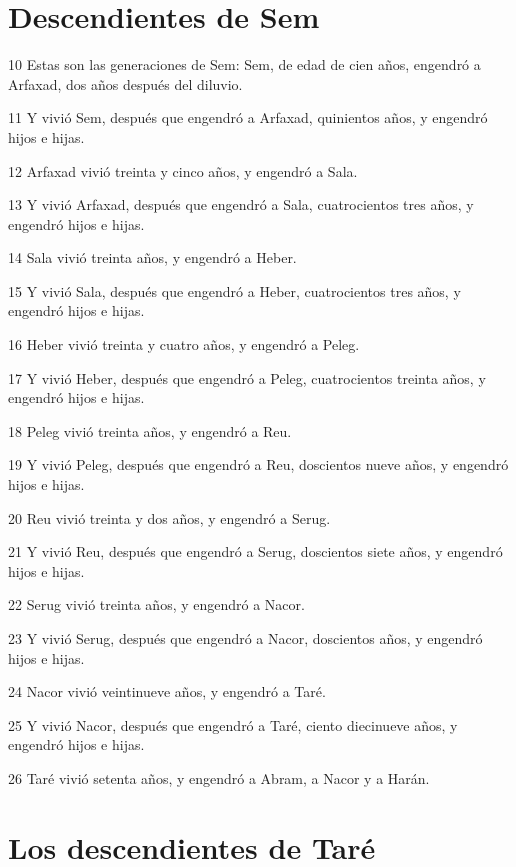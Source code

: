 \section*{Descendientes de Sem}

\par 10 Estas son las generaciones de Sem: Sem, de edad de cien años, engendró a Arfaxad, dos años después del diluvio.
\par 11 Y vivió Sem, después que engendró a Arfaxad, quinientos años, y engendró hijos e hijas.
\par 12 Arfaxad vivió treinta y cinco años, y engendró a Sala.
\par 13 Y vivió Arfaxad, después que engendró a Sala, cuatrocientos tres años, y engendró hijos e hijas.
\par 14 Sala vivió treinta años, y engendró a Heber.
\par 15 Y vivió Sala, después que engendró a Heber, cuatrocientos tres años, y engendró hijos e hijas.
\par 16 Heber vivió treinta y cuatro años, y engendró a Peleg.
\par 17 Y vivió Heber, después que engendró a Peleg, cuatrocientos treinta años, y engendró hijos e hijas.
\par 18 Peleg vivió treinta años, y engendró a Reu.
\par 19 Y vivió Peleg, después que engendró a Reu, doscientos nueve años, y engendró hijos e hijas.
\par 20 Reu vivió treinta y dos años, y engendró a Serug.
\par 21 Y vivió Reu, después que engendró a Serug, doscientos siete años, y engendró hijos e hijas.
\par 22 Serug vivió treinta años, y engendró a Nacor.
\par 23 Y vivió Serug, después que engendró a Nacor, doscientos años, y engendró hijos e hijas.
\par 24 Nacor vivió veintinueve años, y engendró a Taré.
\par 25 Y vivió Nacor, después que engendró a Taré, ciento diecinueve años, y engendró hijos e hijas.
\par 26 Taré vivió setenta años, y engendró a Abram, a Nacor y a Harán.

\section*{Los descendientes de Taré}

